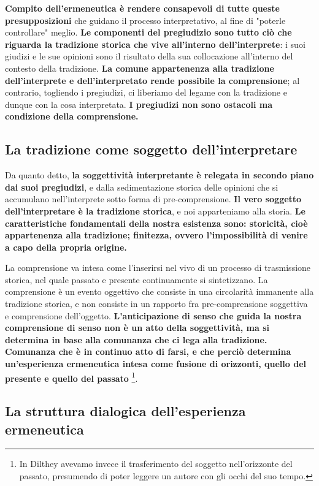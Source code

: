 \textbf{Compito dell'ermeneutica è rendere consapevoli di
tutte queste presupposizioni} che guidano il processo
interpretativo, al fine di  "poterle controllare"
meglio.
\textbf{Le componenti del pregiudizio sono tutto ciò che
riguarda la tradizione storica che vive all'interno dell'interprete}: i suoi giudizi e le sue opinioni sono
il risultato della sua collocazione all'interno
del contesto della tradizione.
\textbf{La comune appartenenza alla tradizione dell'interprete
e dell'interpretato rende possibile la comprensione}; al contrario,
togliendo i pregiudizi, ci liberiamo del legame con
la tradizione e dunque con la cosa interpretata.
\textbf{I pregiudizi non sono ostacoli ma condizione della
comprensione.}

\subsection{La tradizione come soggetto dell'interpretare}

Da quanto detto, \textbf{la soggettività interpretante è
relegata in secondo piano dai suoi pregiudizi}, e dalla
sedimentazione storica delle opinioni che si accumulano
nell'interprete sotto forma di pre-comprensione.
\textbf{Il vero soggetto dell'interpretare è la tradizione
storica}, e noi apparteniamo alla storia.
\textbf{Le caratteristiche fondamentali della nostra esistenza
sono: storicità, cioè appartenenza alla tradizione;
finitezza, ovvero l'impossibilità di venire a capo
della propria origine.}

La comprensione va intesa come l'inserirsi nel vivo
di un processo di trasmissione storica, nel quale
passato e presente continuamente si sintetizzano.
La comprensione è un evento oggettivo che consiste
in una circolarità immanente alla tradizione
storica, e non consiste in un rapporto fra pre-comprensione soggettiva e comprensione dell'oggetto.
\textbf{L'anticipazione di senso che guida la nostra comprensione
di senso non è un atto della soggettività, ma si
determina in base alla comunanza che ci lega
alla tradizione. Comunanza che è in continuo
atto di farsi, e che perciò determina un'esperienza ermeneutica intesa come fusione di
orizzonti, quello del presente e quello del passato}
\footnote{In Dilthey avevamo invece il trasferimento del soggetto nell'orizzonte del passato, presumendo
	di poter leggere un autore con gli occhi del suo
	tempo.}.

\subsection{La struttura dialogica dell'esperienza ermeneutica}

